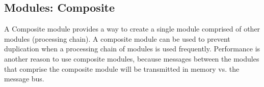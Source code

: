 \par
\subsection{Modules: Composite}
A Composite module provides a way to create a single module 
comprised of other modules (processing chain).  A composite module can be used to prevent 
duplication when a processing chain of modules is used frequently.  
Performance is another reason to use composite modules, because messages between the 
modules that comprise the composite module will be transmitted in memory vs. the message 
bus.  

\par
